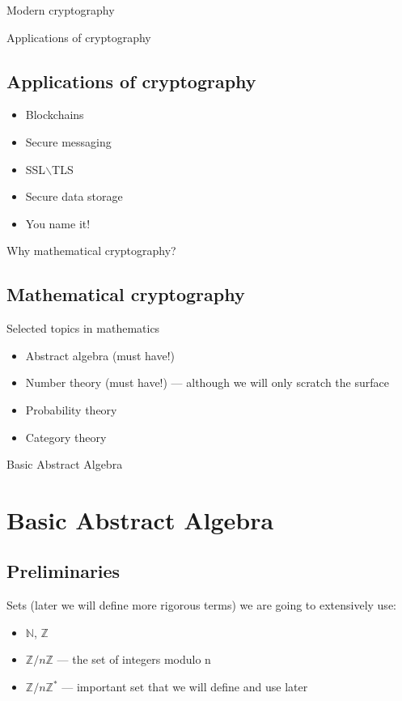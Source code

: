 \documentclass{beamer}
\begin{document}
\begin{frame}{Modern cryptography}
\begin{center}
\begin{minipage}{0.5\linewidth}
    \end{minipage}
    \end{center}
\end{frame}

\begin{frame}{Applications of cryptography}
    \subsection{Applications of cryptography}
    \begin{itemize}
        \item Blockchains
        \item Secure messaging
        \item SSL$\backslash$TLS
        \item Secure data storage
        \item You name it!
    \end{itemize}
\end{frame}

\begin{frame}{Why mathematical cryptography?}
    \subsection{Mathematical cryptography}
    Selected topics in mathematics
    \begin{itemize}
        \item Abstract algebra (must have!)
        \item Number theory (must have!) --- although we will only scratch the surface
        \item Probability theory
        \item Category theory
    \end{itemize}
\end{frame}


\begin{frame}{Basic Abstract Algebra}
    \section{Basic Abstract Algebra}
    \subsection{Preliminaries}
    Sets (later we will define more rigorous terms) we are going to extensively use:
    \begin{itemize}
        \item $\mathbb{N}$, $\mathbb{Z}$
        \item $\mathbb{Z} / n\mathbb{Z}$ --- the set of integers modulo n
        \item $\mathbb{Z} / n \mathbb{Z}^{*}$ --- important set that we will define and use later
    \end{itemize} 
\end{frame}
\end{document}
